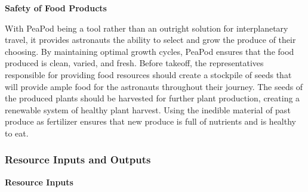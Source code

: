 \documentclass{report}
\begin{document}

\textbf{Safety of Food Products}



With PeaPod being a tool rather than an outright solution for interplanetary travel, it provides astronauts the ability to select and grow the produce of their choosing. By maintaining optimal growth cycles, PeaPod ensures that the food produced is clean, varied, and fresh. Before takeoff, the representatives responsible for providing food resources should create a stockpile of seeds that will provide ample food for the astronauts throughout their journey. The seeds of the produced plants should be harvested for further plant production, creating a renewable system of healthy plant harvest. Using the inedible material of past produce as fertilizer ensures that new produce is full of nutrients and is healthy to eat.

\newpage

\subsubsection{Resource Inputs and Outputs}


\textbf{Resource Inputs}



\end{document}
